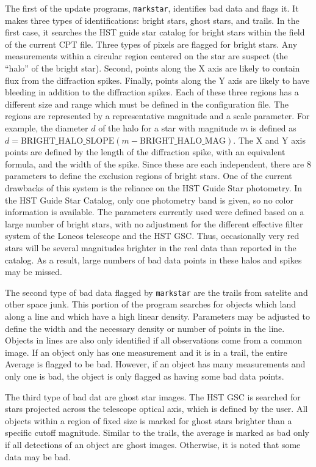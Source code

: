 \documentclass{article}
\begin{document}
The first of the update programs, {\tt markstar}, identifies bad data
and flags it.  It makes three types of identifications: bright stars,
ghost stars, and trails.  In the first case, it searches the HST guide
star catalog for bright stars within the field of the current CPT
file.  Three types of pixels are flagged for bright stars.  Any
measurements within a circular region centered on the star are suspect
(the ``halo'' of the bright star).  Second, points along the X axis
are likely to contain flux from the diffraction spikes.  Finally,
points along the Y axis are likely to have bleeding in addition to the
diffraction spikes.  Each of these three regions has a different size
and range which must be defined in the configuration file.  The
regions are represented by a representative magnitude and a scale
parameter.  For example, the diameter $d$ of the halo for a star with
magnitude $m$ is defined as 
$d = \mbox{BRIGHT\_HALO\_SLOPE} (m - \mbox{BRIGHT\_HALO\_MAG})$.  The X and
Y axis points are defined by the length of the diffraction spike, with
an equivalent formula, and the width of the spike.  Since these are
each independent, there are 8 parameters to define the exclusion
regions of bright stars.  One of the current drawbacks of this system
is the reliance on the HST Guide Star photometry.  In the HST Guide
Star Catalog, only one photometry band is given, so no color
information is available.  The parameters currently used were defined
based on a large number of bright stars, with no adjustment for the
different effective filter system of the Loneos telescope and the HST
GSC.  Thus, occasionally very red stars will be several magnitudes
brighter in the real data than reported in the catalog.  As a result,
large numbers of bad data points in these halos and spikes may be
missed.  

The second type of bad data flagged by {\tt markstar} are the trails
from satelite and other space junk.  This portion of the program
searches for objects which land along a line and which have a high
linear density.  Parameters may be adjusted to define the width and
the necessary density or number of points in the line.  Objects in
lines are also only identified if all observations come from a common
image.  If an object only has one measurement and it is in a trail,
the entire Average is flagged to be bad.  However, if an object has
many measurements and only one is bad, the object is only flagged as
having some bad data points.  

The third type of bad dat are ghost star images.  The HST GSC is
searched for stars projected across the telescope optical axis, which
is defined by the user.  All objects within a region of fixed size is
marked for ghost stars brighter than a specific cutoff magnitude.
Similar to the trails, the average is marked as bad only if all
detections of an object are ghost images.  Otherwise, it is noted that
some data may be bad.
\end{document}
